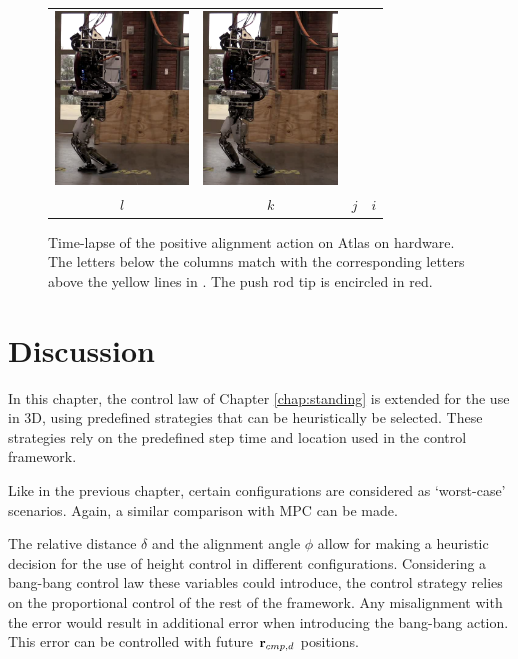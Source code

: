 \begin{figure}
\begin{tabular}{cccc}
    \includegraphics[width=1.4in]{STYLESTUFF/atw10} &
    \includegraphics[width=1.4in]{STYLESTUFF/atw9} \\
    $l$ & $k$ & $j$ & $i$ 
  \end{tabular}
  \caption{Time-lapse of the positive alignment action on Atlas on hardware. The letters below the columns match with the corresponding letters above the yellow lines in . The push rod tip is encircled in red.}
  \label{fig:atw}
\end{figure}
\section{Discussion}
In this chapter, the control law of Chapter \ref{chap:standing} is extended for the use in \ac{3D}, using predefined strategies that can be heuristically be selected. These strategies rely on the predefined step time and location used in the control framework.

Like in the previous chapter, certain configurations are considered as `worst-case' scenarios. Again, a similar comparison with \ac{MPC} can be made. 

The relative distance $\delta$ and the alignment angle $\phi$ allow for making a heuristic decision for the use of height control in different configurations. Considering a bang-bang control law these variables could introduce, the control strategy relies on the proportional control of the rest of the framework. Any misalignment with the error would result in additional error when introducing the bang-bang action. This error can be controlled with future $\mathbf{r}_{cmp,d}$ positions.

